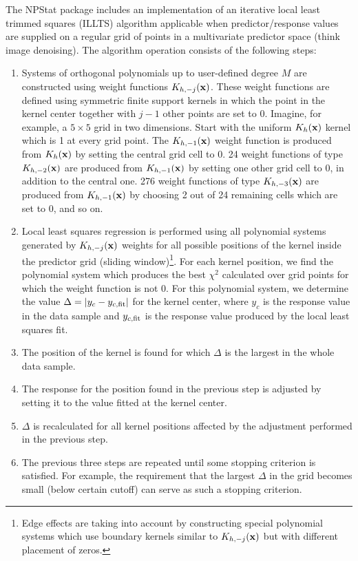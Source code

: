 \documentclass[12pt,titlepage]{article}
\begin{document}
The NPStat package includes an implementation of an iterative
local least trimmed
squares (ILLTS) algorithm applicable when predictor/response
values are supplied on a regular grid of points in a multivariate
predictor space (think image denoising). The algorithm operation
consists of the following steps:
\begin{enumerate}
\item Systems of orthogonal polynomials up to user-defined degree $M$
      are constructed using weight functions $K_{h,-j}({\bf x})$.
      These weight functions are defined using symmetric
      finite support kernels in which the point in the kernel
      center together with $j - 1$ other points are set to 0.
      Imagine, for example, a $5 \times 5$ grid in two dimensions.
      Start with the uniform $K_h({\bf x})$ kernel which is 1 at every
      grid point. The $K_{h,-1}({\bf x})$ weight function
      is produced from $K_h({\bf x})$ by setting the central grid
      cell to 0. 24 weight functions of type $K_{h,-2}({\bf x})$
      are produced from $K_{h,-1}({\bf x})$ by setting one other
      grid cell to 0, in addition to the central one. 276
      weight functions of type $K_{h,-3}({\bf x})$ are produced
      from $K_{h,-1}({\bf x})$ by choosing 2 out of 24 remaining
      cells which are set to 0, and so on.

\item Local least squares regression is performed using all
      polynomial systems generated by $K_{h,-j}({\bf x})$ weights
      for all possible positions of the kernel inside the predictor
      grid (sliding window)\footnote{Edge effects are taking into
      account by constructing special polynomial systems 
      which use boundary kernels similar to
      $K_{h,-j}({\bf x})$ but with different placement of zeros.}.
      For each kernel position,
      we find the polynomial system which produces the best
      $\chi^2$ calculated over grid points for
      which the weight function is not 0. For this polynomial
      system, we determine the value
      $\Delta = |y_c - y_{c,\mbox{\scriptsize fit}}|$ for the
      kernel center, where $y_c$ is the response value in
      the data sample and $y_{c,\mbox{\scriptsize fit}}$ is
      the response value produced by the local least squares fit.

\item The position of the kernel is found for which
      $\Delta$ is the largest in the whole data sample.

\item The response for the position found
      in the previous step is adjusted by setting it
      to the value fitted at the kernel center.

\item $\Delta$ is recalculated for all kernel positions affected by
      the adjustment performed in the previous step.

\item The previous three steps are repeated until some stopping
      criterion is satisfied. For example, the requirement that
      the largest $\Delta$ in the grid becomes small (below certain
      cutoff) can serve as such a stopping criterion.
\end{enumerate}
\end{document}
